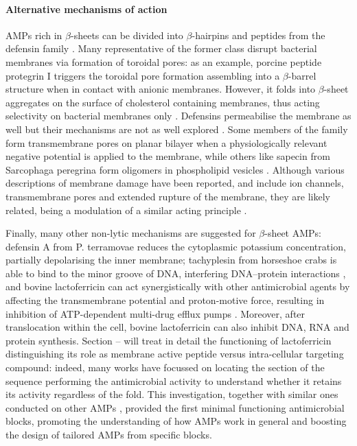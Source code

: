 \paragraph{Alternative mechanisms of action} AMPs rich in $\beta$-sheets can be divided into $\beta$-hairpins and peptides from the defensin family \cite{Nguyen2011}.
%
Many representative of the former class disrupt bacterial membranes via formation of toroidal pores: as an example, porcine peptide protegrin I triggers the toroidal pore formation assembling into a $\beta$-barrel structure when in contact with anionic membranes. However, it folds into $\beta$-sheet aggregates on the surface of cholesterol containing membranes, thus acting selectivity on bacterial membranes only \cite{Tang2009}.
%
Defensins permeabilise the membrane as well but their mechanisms are not as well explored \cite{Lehrer2004,Zasloff2002,Fujii1993}.
%
Some members of the family form transmembrane pores on planar bilayer when a physiologically relevant negative potential is applied to the membrane,\cite{Kagan1990}
%
while others like sapecin  from Sarcophaga peregrina form oligomers in phospholipid vesicles \cite{Takeuchi2004}.
%
Although various descriptions of membrane damage have been reported, and include ion channels, transmembrane pores and extended rupture of the membrane, they are likely related, being a modulation of a similar acting principle \cite{Dathe1999}.

Finally, many other non-lytic mechanisms are suggested for $\beta$-sheet AMPs: defensin A from P. terramovae reduces the cytoplasmic potassium concentration, partially depolarising the inner membrane; tachyplesin from horseshoe crabs is able to bind to the minor groove of DNA, interfering DNA–protein interactions \cite{Yonezawa1992},
%
and bovine lactoferricin can act synergistically with other antimicrobial agents by affecting the transmembrane potential and proton-motive force, resulting in inhibition of ATP-dependent multi-drug efflux pumps \cite{Gifford2005}.
%
Moreover, after translocation within the cell, bovine lactoferricin can also inhibit DNA, RNA and protein synthesis. Section -- will treat in detail the functioning of lactoferricin distinguishing its role as membrane active peptide versus intra-cellular targeting compound: indeed, many works have focussed on locating the section of the sequence performing the antimicrobial activity \cite{Tomita1994,Hwang1998,Schibli1999,Nguyen2005} to understand whether it retains its activity regardless of the fold. This investigation, together with similar ones conducted on other AMPs \cite{???}, provided the first minimal functioning antimicrobial blocks, promoting the understanding of how AMPs work in general and boosting the design of tailored AMPs from specific blocks.


